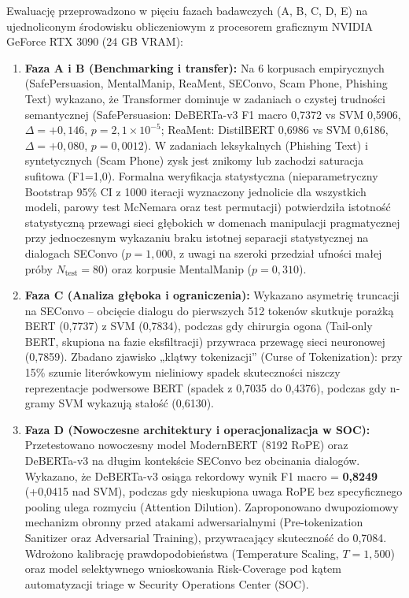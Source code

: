 \documentclass[12pt,a4paper,twoside]{report}
\begin{document}
Ewaluację przeprowadzono w pięciu fazach badawczych (A, B, C, D, E) na ujednoliconym środowisku obliczeniowym z procesorem graficznym NVIDIA GeForce RTX 3090 (24 GB VRAM):
\begin{enumerate}[leftmargin=*]
  \item \textbf{Faza A i B (Benchmarking i transfer):} Na 6 korpusach empirycznych (SafePersuasion, MentalManip, ReaMent, SEConvo, Scam Phone, Phishing Text) wykazano, że Transformer dominuje w zadaniach o czystej trudności semantycznej (SafePersuasion: DeBERTa-v3 F1 macro 0,7372 vs SVM 0,5906, $\Delta=+0,146$, $p = 2,1 \times 10^{-5}$; ReaMent: DistilBERT 0,6986 vs SVM 0,6186, $\Delta=+0,080$, $p = 0,0012$). W zadaniach leksykalnych (Phishing Text) i syntetycznych (Scam Phone) zysk jest znikomy lub zachodzi saturacja sufitowa (F1=1,0). Formalna weryfikacja statystyczna (nieparametryczny Bootstrap 95\% CI z 1000 iteracji wyznaczony jednolicie dla wszystkich modeli, parowy test McNemara oraz test permutacji) potwierdziła istotność statystyczną przewagi sieci głębokich w domenach manipulacji pragmatycznej przy jednoczesnym wykazaniu braku istotnej separacji statystycznej na dialogach SEConvo ($p = 1,000$, z uwagi na szeroki przedział ufności małej próby $N_{\text{test}}=80$) oraz korpusie MentalManip ($p = 0,310$).
  \item \textbf{Faza C (Analiza głęboka i ograniczenia):} Wykazano asymetrię truncacji na SEConvo -- obcięcie dialogu do pierwszych 512 tokenów skutkuje porażką BERT (0,7737) z SVM (0,7834), podczas gdy chirurgia ogona (Tail-only BERT, skupiona na fazie eksfiltracji) przywraca przewagę sieci neuronowej (0,7859). Zbadano zjawisko „klątwy tokenizacji” (Curse of Tokenization): przy 15\% szumie literówkowym nieliniowy spadek skuteczności niszczy reprezentacje podwersowe BERT (spadek z 0,7035 do 0,4376), podczas gdy n-gramy SVM wykazują stałość (0,6130).
  \item \textbf{Faza D (Nowoczesne architektury i operacjonalizacja w SOC):} Przetestowano nowoczesny model ModernBERT (8192 RoPE) oraz DeBERTa-v3 na długim kontekście SEConvo bez obcinania dialogów. Wykazano, że DeBERTa-v3 osiąga rekordowy wynik F1 macro = \textbf{0,8249} (+0,0415 nad SVM), podczas gdy nieskupiona uwaga RoPE bez specyficznego pooling ulega rozmyciu (Attention Dilution). Zaproponowano dwupoziomowy mechanizm obronny przed atakami adwersarialnymi (Pre-tokenization Sanitizer oraz Adversarial Training), przywracający skuteczność do 0,7084. Wdrożono kalibrację prawdopodobieństwa (Temperature Scaling, $T=1,500$) oraz model selektywnego wnioskowania Risk-Coverage pod kątem automatyzacji triage w Security Operations Center (SOC).

\end{enumerate}
\end{document}
